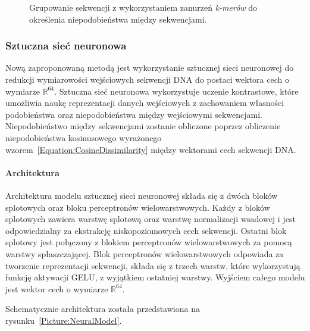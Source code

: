 \begin{figure}[!htb]
\begin{center}
{                    %
                    }
                \end{center}
                \caption{
                    Grupowanie sekwencji z wykorzystaniem zanurzeń \textit{k-merów} do określenia niepodobieństwa między sekwencjami.
                }\label{Picture:Cluster:KMer}
            \end{figure}

        \subsubsection{Sztuczna sieć neuronowa}

            Nową zaproponowaną metodą jest wykorzystanie sztucznej sieci neuronowej do redukcji wymiarowości wejściowych sekwencji DNA do postaci wektora cech o wymiarze $\mathbb{R}^{64}$. Sztuczna sieć neuronowa wykorzystuje uczenie kontrastowe, które umożliwia naukę reprezentacji danych wejściowych z zachowaniem własności podobieństwa oraz niepodobieństwa między wejściowymi sekwencjami. Niepodobieństwo między sekwencjami zostanie obliczone poprzez obliczenie niepodobieństwa kosinusowego wyrażonego wzorem~\eqref{Equation:CosineDissimilarity} między wektorami cech sekwencji DNA.

            \paragraph{Architektura}
                Architektura modelu sztucznej sieci neuronowej składa się z dwóch bloków splotowych oraz bloku perceptronów wielowarstwowych. Każdy z bloków splotowych zawiera warstwę splotową oraz warstwę normalizacji wsadowej i jest odpowiedzialny za ekstrakcję niskopoziomowych cech sekwencji. Ostatni blok splotowy jest połączony z blokiem perceptronów wielowarstwowych za pomocą warstwy spłaszczającej. Blok perceptronów wielowarstwowych odpowiada za tworzenie reprezentacji sekwencji, składa się z trzech warstw, które wykorzystują funkcję aktywacji GELU\cite{Hendrycks:2016}, z wyjątkiem ostatniej warstwy. Wyjściem całego modelu jest wektor cech o wymiarze $\mathbb{R}^{64}$.

                Schematycznie architektura została przedstawiona na rysunku~\ref{Picture:NeuralModel}. 

